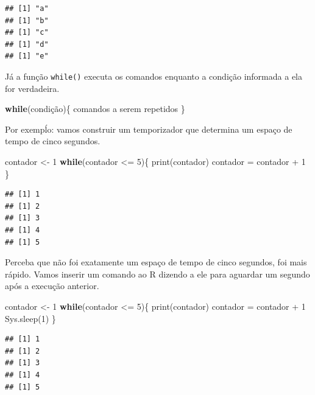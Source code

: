 \documentclass[
]{book}
\newenvironment{Shaded}{\begin{snugshade}}{\end{snugshade}}
\newcommand{\ControlFlowTok}[1]{\textcolor[rgb]{0.13,0.29,0.53}{\textbf{#1}}}
\newcommand{\DecValTok}[1]{\textcolor[rgb]{0.00,0.00,0.81}{#1}}
\newcommand{\FunctionTok}[1]{\textcolor[rgb]{0.00,0.00,0.00}{#1}}
\newcommand{\NormalTok}[1]{#1}
\newcommand{\OtherTok}[1]{\textcolor[rgb]{0.56,0.35,0.01}{#1}}
\newcommand{\SpecialCharTok}[1]{\textcolor[rgb]{0.00,0.00,0.00}{#1}}
\theoremstyle{definition}
\theoremstyle{definition}
\theoremstyle{definition}
\theoremstyle{definition}
\theoremstyle{remark}
\begin{document}
\begin{verbatim}
## [1] "a"
## [1] "b"
## [1] "c"
## [1] "d"
## [1] "e"
\end{verbatim}

Já a função \texttt{while()} executa os comandos enquanto a condição informada a ela for verdadeira.

\begin{Shaded}
\begin{Highlighting}[]
\ControlFlowTok{while}\NormalTok{(condição)\{}
\NormalTok{  comandos a serem repetidos}
\NormalTok{\}}
\end{Highlighting}
\end{Shaded}

Por exempĺo: vamos construir um temporizador que determina um espaço de tempo de cinco segundos.

\begin{Shaded}
\begin{Highlighting}[]
\NormalTok{contador }\OtherTok{\textless{}{-}} \DecValTok{1}
\ControlFlowTok{while}\NormalTok{(contador }\SpecialCharTok{\textless{}=} \DecValTok{5}\NormalTok{)\{}
  \FunctionTok{print}\NormalTok{(contador)}
\NormalTok{  contador }\OtherTok{=}\NormalTok{ contador }\SpecialCharTok{+} \DecValTok{1}
\NormalTok{\}}
\end{Highlighting}
\end{Shaded}

\begin{verbatim}
## [1] 1
## [1] 2
## [1] 3
## [1] 4
## [1] 5
\end{verbatim}

Perceba que não foi exatamente um espaço de tempo de cinco segundos, foi mais rápido. Vamos inserir um comando ao R dizendo a ele para aguardar um segundo após a execução anterior.

\begin{Shaded}
\begin{Highlighting}[]
\NormalTok{contador }\OtherTok{\textless{}{-}} \DecValTok{1}
\ControlFlowTok{while}\NormalTok{(contador }\SpecialCharTok{\textless{}=} \DecValTok{5}\NormalTok{)\{}
  \FunctionTok{print}\NormalTok{(contador)}
\NormalTok{  contador }\OtherTok{=}\NormalTok{ contador }\SpecialCharTok{+} \DecValTok{1}
  \FunctionTok{Sys.sleep}\NormalTok{(}\DecValTok{1}\NormalTok{)}
\NormalTok{\}}
\end{Highlighting}
\end{Shaded}

\begin{verbatim}
## [1] 1
## [1] 2
## [1] 3
## [1] 4
## [1] 5
\end{verbatim}
\end{document}
